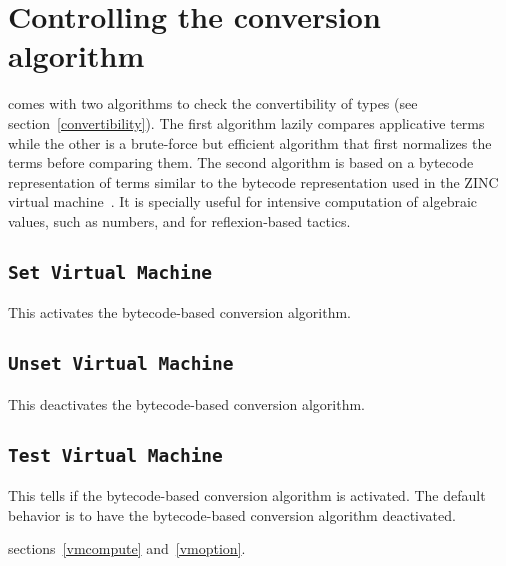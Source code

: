 
\section{Controlling the conversion algorithm}

{\Coq} comes with two algorithms to check the convertibility of types
(see section~\ref{convertibility}). The first algorithm lazily
compares applicative terms while the other is a brute-force but efficient
algorithm that first normalizes the terms before comparing them.  The
second algorithm is based on a bytecode representation of terms
similar to the bytecode representation used in the ZINC virtual
machine~\cite{Leroy90}. It is specially useful for intensive
computation of algebraic values, such as numbers, and for reflexion-based
tactics.

\subsection{\tt Set Virtual Machine
\label{SetVirtualMachine}
}

This activates the bytecode-based conversion algorithm.

\subsection{\tt Unset Virtual Machine
}

This deactivates the bytecode-based conversion algorithm.

\subsection{\tt Test Virtual Machine
}

This tells if the bytecode-based conversion algorithm is
activated. The default behavior is to have the bytecode-based
conversion algorithm deactivated.

\SeeAlso sections~\ref{vmcompute} and~\ref{vmoption}.



